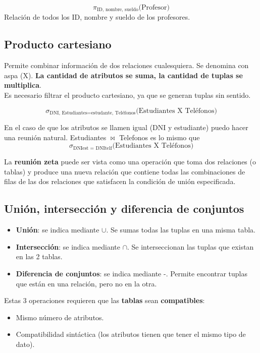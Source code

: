 \documentclass{article}
\begin{document}
$$\pi_{\text{ID, nombre, sueldo}}\text{(Profesor)}$$
Relación de todos los ID, nombre y sueldo de los profesores.

\newpage

\subsection{Producto cartesiano}
Permite combinar información de dos relaciones cualesquiera. Se denomina con aspa (X). \textbf{La cantidad de atributos se suma, la cantidad de tuplas se multiplica}. \\
Es necesario filtrar el producto cartesiano, ya que se generan tuplas sin sentido.

$$\sigma_{\text{DNI, Estudiantes}= \text{estudante, Teléfonos}}\text{(Estudiantes X Teléfonos)}$$

En el caso de que los atributos se llamen igual (DNI y estudiante) puedo hacer una reunión natural. Estudiantes $\Join$ Telefonos es lo mismo que $$\sigma_{\text{DNIest = DNItelf}}\text{(Estudiantes X Teléfonos)}$$

La \textbf{reunión zeta} puede ser vista como una operación que toma dos relaciones (o tablas) y produce una nueva relación que contiene todas las combinaciones de filas de las dos relaciones que satisfacen la condición de unión especificada.

\subsection{Unión, intersección y diferencia de conjuntos}
\begin{itemize}
    \item \textbf{Unión}: se indica mediante $\cup$. Se sumas todas las tuplas en una misma tabla.

    \item \textbf{Intersección}: se indica mediante $\cap$. Se interseccionan las tuplas que existan en las 2 tablas.

    \item \textbf{Diferencia de conjuntos}: se indica mediante -. Permite encontrar tuplas que están en una relación, pero no en la otra. 
\end{itemize}

Estas 3 operaciones requieren que las \textbf{tablas} sean \textbf{compatibles}: 
\begin{itemize}
    \item Mismo número de atributos.
    \item Compatibilidad sintáctica (los atributos tienen que tener el mismo tipo de dato).
\end{itemize}
\end{document}
